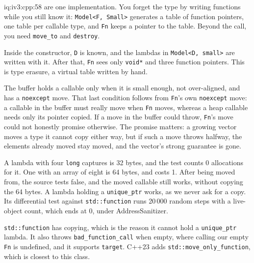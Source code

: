 \begin{solution}{iq:iv3:cpp:58}
 are one implementation. You forget the type by writing functions while you still know it: \texttt{Model<F, Small>} generates a table of function pointers, one table per callable type, and \texttt{Fn} keeps a pointer to the table. Beyond the call, you need \texttt{move\_to} and \texttt{destroy}.
\label{lst:iv3:cp:fn1}
\enlargethispage{-3\baselineskip}%
\label{lst:iv3:cp:fn2}

Inside the constructor, \texttt{D} is known, and the lambdas in \texttt{Model<D, small>} are written with it. After that, \texttt{Fn} sees only \texttt{void*} and three function pointers. This is type erasure, a virtual table written by hand.

The buffer holds a callable only when it is small enough, not over-aligned, and has a \texttt{noexcept} move. That last condition follows from \texttt{Fn}'s own \texttt{noexcept} move: a callable in the buffer must really move when \texttt{Fn} moves, whereas a heap callable needs only its pointer copied. If a move in the buffer could throw, \texttt{Fn}'s move could not honestly promise otherwise. The promise matters: a growing vector moves a type it cannot copy either way, but if such a move throws halfway, the elements already moved stay moved, and the vector's strong guarantee is gone.

A lambda with four \texttt{long} captures is 32 bytes, and the test counts 0 allocations for it. One with an array of eight is 64 bytes, and costs 1. After being moved from, the source tests false, and the moved callable still works, without copying the 64 bytes. A lambda holding a \texttt{unique\_ptr} works, as we never ask for a copy. Its differential test against \texttt{std::function} runs 20\,000 random steps with a live-object count, which ends at 0, under AddressSanitizer.

\texttt{std::function} has copying, which is the reason it cannot hold a \texttt{unique\_ptr} lambda. It also throws \texttt{bad\_function\_call} when empty, where calling our empty \texttt{Fn} is undefined, and it supports \texttt{target}. C++23 adds \texttt{std::move\_only\_function}, which is closest to this class.

\end{solution}

